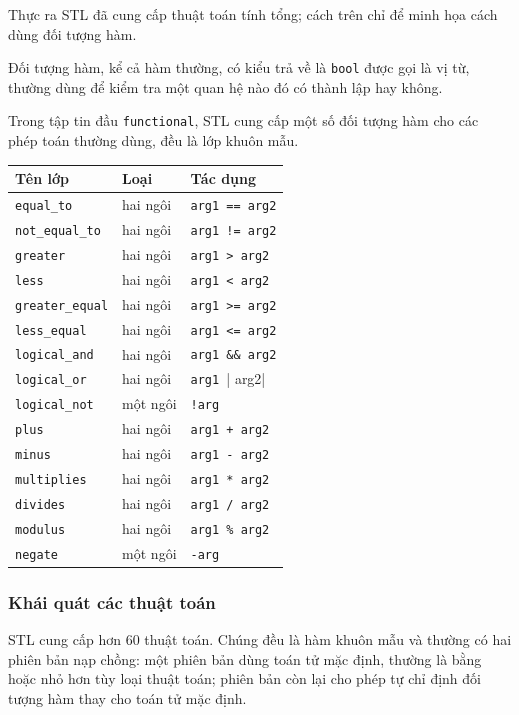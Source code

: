 \documentclass[11pt]{article}
\begin{document}
Thực ra STL đã cung cấp thuật toán tính tổng; cách trên chỉ để minh họa cách
dùng đối tượng hàm.

Đối tượng hàm, kể cả hàm thường, có kiểu trả về là \verb|bool| được gọi là
vị từ, thường dùng để kiểm tra một quan hệ nào đó có thành lập hay không.

Trong tập tin đầu \verb|functional|, STL cung cấp một số đối tượng hàm cho
các phép toán thường dùng, đều là lớp khuôn mẫu.

\begin{center}
\begin{tabular}{lll}
\hline
\textbf{Tên lớp} & \textbf{Loại} & \textbf{Tác dụng}\\
\hline
\verb|equal_to| & hai ngôi & \verb|arg1 == arg2|\\
\verb|not_equal_to| & hai ngôi & \verb|arg1 != arg2|\\
\verb|greater| & hai ngôi & \verb|arg1 > arg2|\\
\verb|less| & hai ngôi & \verb|arg1 < arg2|\\
\verb|greater_equal| & hai ngôi & \verb|arg1 >= arg2|\\
\verb|less_equal| & hai ngôi & \verb|arg1 <= arg2|\\
\verb|logical_and| & hai ngôi & \verb|arg1 && arg2|\\
\verb|logical_or| & hai ngôi & \verb|arg1 || arg2|\\
\verb|logical_not| & một ngôi & \verb|!arg|\\
\verb|plus| & hai ngôi & \verb|arg1 + arg2|\\
\verb|minus| & hai ngôi & \verb|arg1 - arg2|\\
\verb|multiplies| & hai ngôi & \verb|arg1 * arg2|\\
\verb|divides| & hai ngôi & \verb|arg1 / arg2|\\
\verb|modulus| & hai ngôi & \verb|arg1 % arg2|\\
\verb|negate| & một ngôi & \verb|-arg|\\
\hline
\end{tabular}
\end{center}

\subsubsection*{Khái quát các thuật toán}

STL cung cấp hơn \(60\) thuật toán. Chúng đều là hàm khuôn mẫu và thường có
hai phiên bản nạp chồng: một phiên bản dùng toán tử mặc định, thường là bằng
hoặc nhỏ hơn tùy loại thuật toán; phiên bản còn lại cho phép tự chỉ định đối
tượng hàm thay cho toán tử mặc định.
\end{document}
